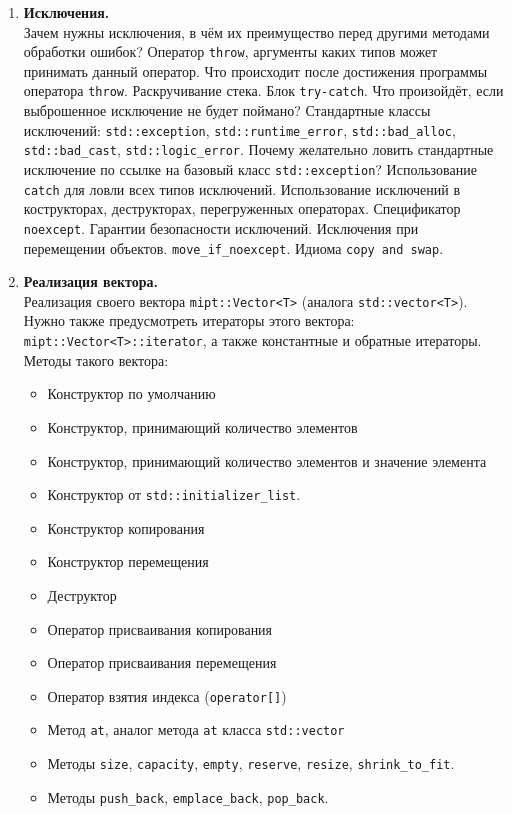 \documentclass{article}
\begin{document}
\begin{enumerate}
\item \textbf{Исключения.}\\
Зачем нужны исключения, в чём их преимущество перед другими методами обработки ошибок?
Оператор \texttt{throw}, аргументы каких типов может принимать данный оператор. Что происходит после достижения программы оператора \texttt{throw}. Раскручивание стека. Блок \texttt{try-catch}. Что произойдёт, если выброшенное исключение не будет поймано? Стандартные классы исключений: \texttt{std::exception}, \texttt{std::runtime\_error}, \texttt{std::bad\_alloc}, \texttt{std::bad\_cast}, \texttt{std::logic\_error}. Почему желательно ловить стандартные исключение по ссылке на базовый класс \texttt{std::exception}? Использование \texttt{catch} для ловли всех типов исключений. Использование исключений в кострукторах, деструкторах, перегруженных операторах. Спецификатор \texttt{noexcept}. Гарантии безопасности исключений. Исключения при перемещении объектов. \texttt{move\_if\_noexcept}. Идиома \texttt{copy and swap}.



\item \textbf{Реализация вектора.}\\
Реализация своего вектора \texttt{mipt::Vector<T>} (аналога \texttt{std::vector<T>}). Нужно также предусмотреть итераторы этого вектора: \texttt{mipt::Vector<T>::iterator}, а также константные и обратные итераторы.\\
Методы такого вектора:
\begin{itemize}
\item Конструктор по умолчанию
\item Конструктор, принимающий количество элементов
\item Конструктор, принимающий количество элементов и значение элемента
\item Конструктор от \texttt{std::initializer\_list}.
\item Конструктор копирования
\item Конструктор перемещения
\item Деструктор
\item Оператор присваивания копирования
\item Оператор присваивания перемещения
\item Оператор взятия индекса (\texttt{operator[]})
\item Метод \texttt{at}, аналог метода \texttt{at} класса \texttt{std::vector}

\item Методы \texttt{size}, \texttt{capacity}, \texttt{empty}, \texttt{reserve}, \texttt{resize}, \texttt{shrink\_to\_fit}.
\item Методы \texttt{push\_back}, \texttt{emplace\_back}, \texttt{pop\_back}.


\end{itemize}
\end{enumerate}
\end{document}
